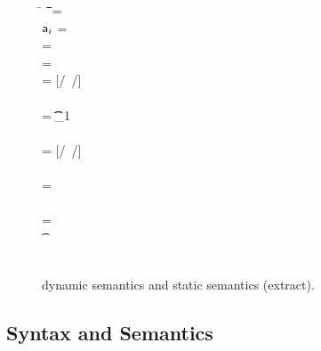 \documentclass[USenglish]{tex/lipics-v2016}
\begin{document}
\begin{figure}[!h]
\begin{minipage}{\textwidth}
\begin{tabbing}
  \K\HS \New{} \HS\= \s~ \HS \=\Red\HS \= \K \HS\= \ap \HS\= \sp\HS \= \WHERE\HS\= \fresh\ap \HS\HS\HS\HS\HS\HS\HS\=  \sp = {\Map{}}
\\
\K\HS \FReadR\a{\f[i]} \> \s           \>\Red\>     \K \>$\a[i]$ \> \s  \> \WHERE \>\App\s\a=\obj\C{\a[1],\ldots\a[i],\a[n]\ldots}
\\
\K\HS {\FWriteR\a{\f[i]}\ap} \> \s     \>\Red\>     \K \> \ap \> \sp \>  \WHERE \>\App\s\a=\obj\C{\a[1],\ldots\a[i],\a[n]\ldots} \HS  
\\ \> \> \> \> \> \> \> \sp = \Map\s{\Bind\a{\obj\C{\a[1],\ldots\ap,\a[n]\ldots}}}
\\
\K\HS{\KCall\a\m\ap\t\tp} \> \s      \>\Red\>     \K \>  \ep \> \s \> \WHERE\> \ep = {[\a/\this~{\ap/\x}]\e} \HS \\ \> \> \> \> \> \> \> \Mdef\m{}\e\In \App\K\C  \\ \> \> \> \> \> \> \>  \App\s\a=\obj{} \> \StrSub {\emptyset}\K\t {\t_{1}} \\ 
\> \> \> \> \> \> \> \StrSub {\emptyset} \tp
\\
 \K\HS {\DynCall\a\m\ap}\> \s        \>\Red\>    \K \> \ep \> \s \>  \WHERE\> \ep = {[\a/\this~{\ap/\x}]\e}\HS \\ \> \> \> \> \> \> \> \Mdef\m\x\any\any\e \In \App\K\C \\ \> \> \> \> \> \> \> \App\s\a=\obj{} 
\\
 \K\HS {\SubCast \any\a} \> \s       \>\Red\>   \K \> \a \> \s
\\
 \K\HS {\SubCast \D\a} \> \s        \>\Red\>    \K \> \a \> \s \>  \WHERE\> \StrSub {\emptyset}\K\C \D \>\App\s\a=\obj{} 
\\
 \K\HS {\BehCast \t\a} \> \s         \>\Red\>   \Kp \> \ap \> \sp \> \WHERE\> \behcast \a\t\s\K \Kp\ap\sp    
\\
\K \HS \EM{\EE[\e]} \> \s            \>\Red\>   \Kp \> \EM{\EE[\ep]} \> \sp \> \WHERE \> \K~\e~\s \Red~\Kp~\ep~\sp
\end{tabbing}
\end{minipage}

\medskip
\hrulefill
\caption{\kafka dynamic semantics and static semantics
  (extract).}\label{fig:kafka}
\end{figure}


\subsection{Syntax and Semantics}
\end{document}
